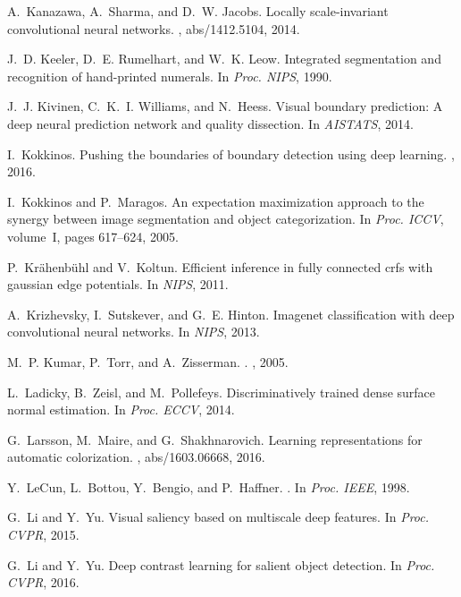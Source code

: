\documentclass[10pt,twocolumn,letterpaper]{article}
\begin{document}
\begin{thebibliography}{100}
	A.~Kanazawa, A.~Sharma, and D.~W. Jacobs.
	\newblock Locally scale-invariant convolutional neural networks.
	, abs/1412.5104, 2014.
	
	J.~D. Keeler, D.~E. Rumelhart, and W.~K. Leow.
	\newblock Integrated segmentation and recognition of hand-printed numerals.
	\newblock In {\em Proc. {NIPS}}, 1990.
	
	J.~J. Kivinen, C.~K.~I. Williams, and N.~Heess.
	\newblock Visual boundary prediction: {A} deep neural prediction network and
	quality dissection.
	\newblock In {\em AISTATS}, 2014.
	
	I.~Kokkinos.
	\newblock Pushing the boundaries of boundary detection using deep learning.
	, 2016.
	
	I.~Kokkinos and P.~Maragos.
	\newblock An expectation maximization approach to the synergy between image
	segmentation and object categorization.
	\newblock In {\em Proc. {ICCV}}, volume~I, pages 617--624, 2005.
	
	P.~Kr{\"a}henb{\"u}hl and V.~Koltun.
	\newblock Efficient inference in fully connected crfs with gaussian edge
	potentials.
	\newblock In {\em NIPS}, 2011.
	
	A.~Krizhevsky, I.~Sutskever, and G.~E. Hinton.
	\newblock Imagenet classification with deep convolutional neural networks.
	\newblock In {\em NIPS}, 2013.
	
	M.~P. Kumar, P.~Torr, and A.~Zisserman.
	.
	, 2005.
	
	L.~Ladicky, B.~Zeisl, and M.~Pollefeys.
	\newblock Discriminatively trained dense surface normal estimation.
	\newblock In {\em Proc. {ECCV}}, 2014.
	
	G.~Larsson, M.~Maire, and G.~Shakhnarovich.
	\newblock Learning representations for automatic colorization.
	, abs/1603.06668, 2016.
	
	Y.~LeCun, L.~Bottou, Y.~Bengio, and P.~Haffner.
	.
	\newblock In {\em Proc. IEEE}, 1998.
	
	G.~Li and Y.~Yu.
	\newblock Visual saliency based on multiscale deep features.
	\newblock In {\em Proc. {CVPR}}, 2015.
	
	G.~Li and Y.~Yu.
	\newblock Deep contrast learning for salient object detection.
	\newblock In {\em Proc. {CVPR}}, 2016.
	

\end{thebibliography}
\end{document}
